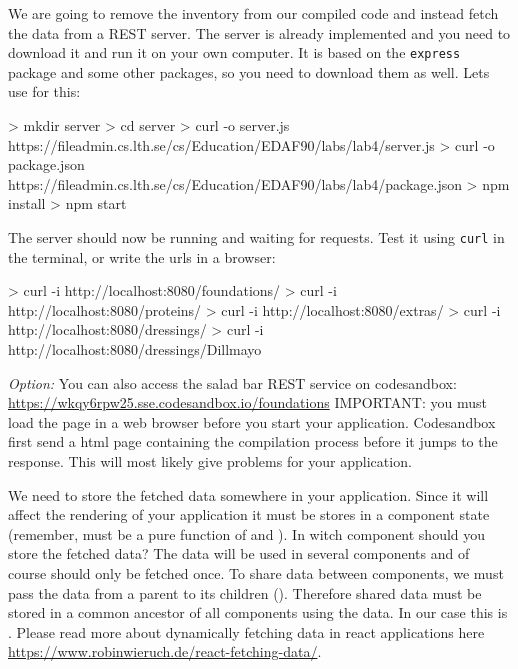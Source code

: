 \documentclass[fleqn, article, a4paper]{memoir}
\begin{document}
\begin{Assignments}

\item We are going to remove the inventory from our compiled code and instead fetch the data from a REST server. The server is already implemented and you need to download it and run it on your own computer. It is based on the \texttt{express} package and some other packages, so you need to download them as well. Lets use  for this:
\begin{Code}
> mkdir server
> cd server
> curl -o server.js https://fileadmin.cs.lth.se/cs/Education/EDAF90/labs/lab4/server.js
> curl -o package.json 
          https://fileadmin.cs.lth.se/cs/Education/EDAF90/labs/lab4/package.json
> npm install
> npm start
\end{Code}
The server should now be running and waiting for requests. Test it using \texttt{curl} in the terminal, or write the urls in a browser:
\begin{Code}
> curl -i http://localhost:8080/foundations/
> curl -i http://localhost:8080/proteins/
> curl -i http://localhost:8080/extras/
> curl -i http://localhost:8080/dressings/
> curl -i http://localhost:8080/dressings/Dillmayo
\end{Code}

\noindent \emph{Option:} You can also access the salad bar REST service on codesandbox: \url{https://wkqy6rpw25.sse.codesandbox.io/foundations} IMPORTANT: you must load the page in a web browser before you start your application. Codesandbox first send a html page containing the compilation process before it jumps to the  response. This will most likely give problems for your application.

\item We need to store the fetched data somewhere in your application. Since it will affect the rendering of your application it must be stores in a component state (remember,  must be a pure function of  and ). In witch component should you store the fetched data? The data will be used in several components and of course should only be fetched once. To share data between components, we must pass the data from a parent to its children (). Therefore shared data must be stored in a common ancestor of all components using the data. In our case this is . Please read more about dynamically fetching data in react applications here \url{https://www.robinwieruch.de/react-fetching-data/}.


\end{Assignments}
\end{document}
